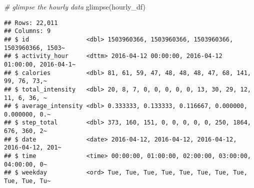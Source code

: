 \documentclass[
]{article}
\newenvironment{Shaded}{\begin{snugshade}}{\end{snugshade}}
\newcommand{\AttributeTok}[1]{\textcolor[rgb]{0.77,0.63,0.00}{#1}}
\newcommand{\CommentTok}[1]{\textcolor[rgb]{0.56,0.35,0.01}{\textit{#1}}}
\newcommand{\ConstantTok}[1]{\textcolor[rgb]{0.00,0.00,0.00}{#1}}
\newcommand{\DecValTok}[1]{\textcolor[rgb]{0.00,0.00,0.81}{#1}}
\newcommand{\FunctionTok}[1]{\textcolor[rgb]{0.00,0.00,0.00}{#1}}
\newcommand{\NormalTok}[1]{#1}
\newcommand{\OtherTok}[1]{\textcolor[rgb]{0.56,0.35,0.01}{#1}}
\newcommand{\SpecialCharTok}[1]{\textcolor[rgb]{0.00,0.00,0.00}{#1}}
\newcommand{\StringTok}[1]{\textcolor[rgb]{0.31,0.60,0.02}{#1}}
\begin{document}
\begin{Shaded}
\end{Shaded}

\begin{Shaded}
\begin{Highlighting}[]
\CommentTok{\# glimpse the hourly data}
\FunctionTok{glimpse}\NormalTok{(hourly\_df)}
\end{Highlighting}
\end{Shaded}

\begin{verbatim}
## Rows: 22,011
## Columns: 9
## $ id                <dbl> 1503960366, 1503960366, 1503960366, 1503960366, 1503~
## $ activity_hour     <dttm> 2016-04-12 00:00:00, 2016-04-12 01:00:00, 2016-04-1~
## $ calories          <dbl> 81, 61, 59, 47, 48, 48, 48, 47, 68, 141, 99, 76, 73,~
## $ total_intensity   <dbl> 20, 8, 7, 0, 0, 0, 0, 0, 13, 30, 29, 12, 11, 6, 36, ~
## $ average_intensity <dbl> 0.333333, 0.133333, 0.116667, 0.000000, 0.000000, 0.~
## $ step_total        <dbl> 373, 160, 151, 0, 0, 0, 0, 0, 250, 1864, 676, 360, 2~
## $ date              <date> 2016-04-12, 2016-04-12, 2016-04-12, 2016-04-12, 201~
## $ time              <time> 00:00:00, 01:00:00, 02:00:00, 03:00:00, 04:00:00, 0~
## $ weekday           <ord> Tue, Tue, Tue, Tue, Tue, Tue, Tue, Tue, Tue, Tue, Tu~
\end{verbatim}
\end{document}
